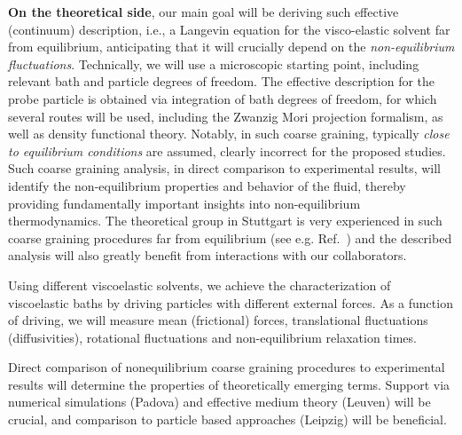 \begin{workpackage}
\begin{wpdescription}
{\bf On the theoretical side}, our main goal will be deriving such effective (continuum)
description, i.e., a Langevin equation for the visco-elastic solvent far from equilibrium,
anticipating that it will crucially depend on the {\it non-equilibrium
  fluctuations}. Technically, we will use a microscopic starting point, including relevant
bath and particle degrees of freedom. The effective description for the probe particle is
obtained via integration of bath degrees of freedom, for which several routes will be used,
including the Zwanzig Mori projection formalism, as well as density functional
theory. Notably, in such coarse graining, typically {\it close to equilibrium conditions}
are assumed, clearly incorrect for the proposed studies. Such coarse graining analysis, in
direct comparison to experimental results, will identify the non-equilibrium properties and
behavior of the fluid, thereby providing fundamentally important insights into
non-equilibrium thermodynamics. The theoretical group in Stuttgart is very experienced in
such coarse graining procedures far from equilibrium (see e.g. Ref.~\cite{Aerov14}) and the described analysis will also
greatly benefit from interactions with our collaborators.


\end{wpdescription}

\begin{tasklist}

\begin{task}[title=Experimental characterization of viscoelastic baths,id=brown-t1,PM=24,lead=USTUTT,wphases=0-24!1.0]
Using different viscoelastic solvents, we achieve the characterization of viscoelastic baths
by driving particles with different external forces. As a function of driving, we will
measure mean (frictional) forces, translational fluctuations (diffusivities), rotational
fluctuations and non-equilibrium relaxation times.
\end{task}

\begin{task}[title=Theoretical identification of non-equilibrium signatures of the bath,id=brown-t1-bis,PM=24,lead=USTUTT,wphases=0-24!1.0,partners={KUL,UNIPD,ULEI}]
Direct comparison of nonequilibrium coarse graining procedures to experimental results will
determine the properties of theoretically emerging terms. Support via numerical simulations
(Padova) and effective medium theory (Leuven) will be crucial, and comparison to particle
based approaches (Leipzig) will be beneficial.
\end{task}


\end{tasklist}
\end{workpackage}
